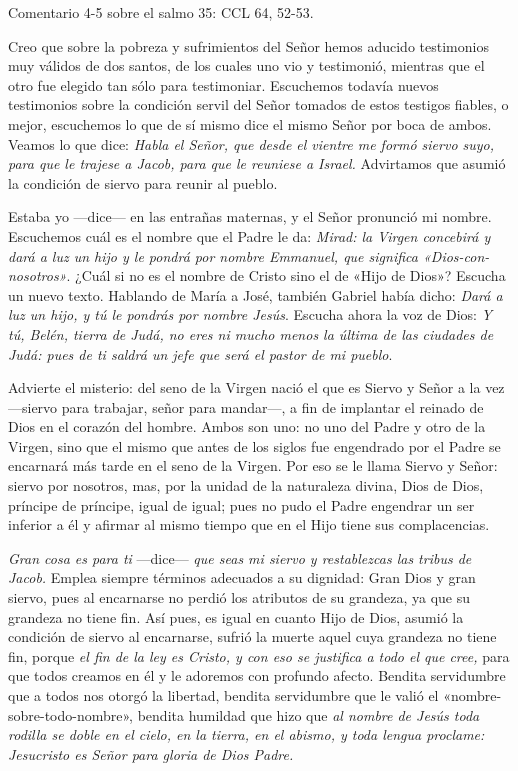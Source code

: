 \documentclass[]{article}
\begin{document}
Comentario 4-5 sobre el salmo 35: CCL 64, 52-53.

Creo que sobre la pobreza y sufrimientos del Señor hemos aducido
testimonios muy válidos de dos santos, de los cuales uno vio y
testimonió, mientras que el otro fue elegido tan sólo para testimoniar.
Escuchemos todavía nuevos testimonios sobre la condición servil del
Señor tomados de estos testigos fiables, o mejor, escuchemos lo que de
sí mismo dice el mismo Señor por boca de ambos. Veamos lo que dice:
\emph{Habla el Señor, que desde el vientre me formó siervo suyo, para
que le trajese a Jacob, para que le reuniese a Israel.} Advirtamos que
asumió la condición de siervo para reunir al pueblo.

Estaba yo ---dice--- en las entrañas maternas, y el Señor pronunció mi
nombre. Escuchemos cuál es el nombre que el Padre le da: \emph{Mirad: la
Virgen concebirá y dará a luz un hijo y le pondrá por nombre Emmanuel,
que significa «Dios-con-nosotros»}. ¿Cuál si no es el nombre de Cristo
sino el de «Hijo de Dios»? Escucha un nuevo texto. Hablando de María a
José, también Gabriel había dicho: \emph{Dará a luz un hijo, y tú le
pondrás por nombre Jesús}. Escucha ahora la voz de Dios: \emph{Y tú,
Belén, tierra de Judá, no eres ni mucho menos la última de las ciudades
de Judá: pues de ti saldrá un jefe que será el pastor de mi pueblo}.

Advierte el misterio: del seno de la Virgen nació el que es Siervo y
Señor a la vez ---siervo para trabajar, señor para mandar---, a fin de
implantar el reinado de Dios en el corazón del hombre. Ambos son uno: no
uno del Padre y otro de la Virgen, sino que el mismo que antes de los
siglos fue engendrado por el Padre se encarnará más tarde en el seno de
la Virgen. Por eso se le llama Siervo y Señor: siervo por nosotros, mas,
por la unidad de la naturaleza divina, Dios de Dios, príncipe de
príncipe, igual de igual; pues no pudo el Padre engendrar un ser
inferior a él y afirmar al mismo tiempo que en el Hijo tiene sus
complacencias.

\emph{Gran cosa es para ti} ---dice--- \emph{que seas mi siervo y
restablezcas las tribus de Jacob.} Emplea siempre términos adecuados a
su dignidad: Gran Dios y gran siervo, pues al encarnarse no perdió los
atributos de su grandeza, ya que su grandeza no tiene fin. Así pues, es
igual en cuanto Hijo de Dios, asumió la condición de siervo al
encarnarse, sufrió la muerte aquel cuya grandeza no tiene fin, porque
\emph{el fin de la ley es Cristo, y con eso se justifica a todo el que
cree,} para que todos creamos en él y le adoremos con profundo afecto.
Bendita servidumbre que a todos nos otorgó la libertad, bendita
servidumbre que le valió el «nombre-sobre-todo-nombre», bendita humildad
que hizo que \emph{al nombre de Jesús toda rodilla se doble en el cielo,
en la tierra, en el abismo, y toda lengua proclame: Jesucristo es Señor
para gloria de Dios Padre.}
\end{document}
